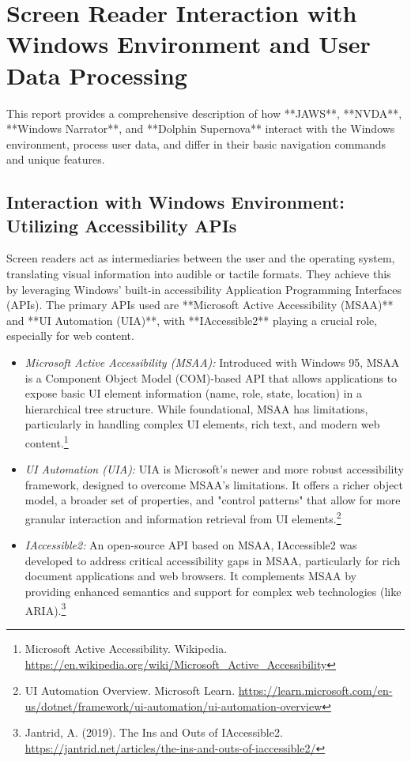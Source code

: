 \chapter{Screen Reader Interaction with Windows Environment and User Data Processing}
\label{chap:screenreader-windows}

This report provides a comprehensive description of how **JAWS**, **NVDA**, **Windows Narrator**, and **Dolphin Supernova** interact with the Windows environment, process user data, and differ in their basic navigation commands and unique features.

\section{Interaction with Windows Environment: Utilizing Accessibility APIs}
\label{sec:interaction-apis}

Screen readers act as intermediaries between the user and the operating system, translating visual information into audible or tactile formats. They achieve this by leveraging Windows' built-in accessibility Application Programming Interfaces (APIs). The primary APIs used are **Microsoft Active Accessibility (MSAA)** and **UI Automation (UIA)**, with **IAccessible2** playing a crucial role, especially for web content.

\begin{itemize}
    \item \emph{Microsoft Active Accessibility (MSAA):} Introduced with Windows 95, MSAA is a Component Object Model (COM)-based API that allows applications to expose basic UI element information (name, role, state, location) in a hierarchical tree structure. While foundational, MSAA has limitations, particularly in handling complex UI elements, rich text, and modern web content.\footnote{Microsoft Active Accessibility. Wikipedia. \url{https://en.wikipedia.org/wiki/Microsoft_Active_Accessibility}}
    \item \emph{UI Automation (UIA):} UIA is Microsoft's newer and more robust accessibility framework, designed to overcome MSAA's limitations. It offers a richer object model, a broader set of properties, and "control patterns" that allow for more granular interaction and information retrieval from UI elements.\footnote{UI Automation Overview. Microsoft Learn. \url{https://learn.microsoft.com/en-us/dotnet/framework/ui-automation/ui-automation-overview}}
    \item \emph{IAccessible2:} An open-source API based on MSAA, IAccessible2 was developed to address critical accessibility gaps in MSAA, particularly for rich document applications and web browsers. It complements MSAA by providing enhanced semantics and support for complex web technologies (like ARIA).\footnote{Jantrid, A. (2019). The Ins and Outs of IAccessible2. \url{https://jantrid.net/articles/the-ins-and-outs-of-iaccessible2/}}
\end{itemize}

